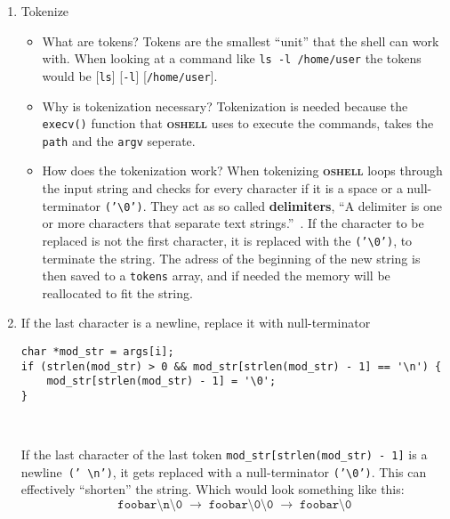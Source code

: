\documentclass[12pt,english]{article}
\newcommand{\funcname}[1]{\texttt{#1()}\xspace} %
\newcommand{\projectname}{\textsc{oshell}}
\begin{document}
\begin{enumerate}
\item Tokenize
  \begin{itemize}
  \item What are tokens?
    Tokens are the smallest ``unit'' that the shell can work with. When
    looking at a command like \texttt{ls -l /home/user} the tokens
    would be [\texttt{ls}] [\texttt{-l}] [\texttt{/home/user}].

  \item Why is tokenization necessary? Tokenization is needed because
    the \funcname{execv} function that \textbf{\projectname} uses to
    execute the
    commands, takes the \texttt{path} and the \texttt{argv} seperate.

  \item How does the tokenization work? When tokenizing
    \textbf{\projectname} loops through the input string and
    checks for every character if it is a space or a null-terminator \texttt{('\textbackslash0')}.
    They act as so called \textbf{delimiters},
    ``A delimiter is one or more characters that separate text strings.''~\cite{WhatDelimiter}.
    If the character 
    to be replaced is not the first character, it is replaced with the \texttt{('\textbackslash0')},  to terminate the string. The adress of the beginning of the new string is then saved to a \texttt{tokens} array, and if needed 
   the memory will be reallocated to fit the string.
    \end{itemize}
    
  \item If the last character is a newline, replace it with null-terminator
\begin{verbatim}
char *mod_str = args[i];
if (strlen(mod_str) > 0 && mod_str[strlen(mod_str) - 1] == '\n') {
    mod_str[strlen(mod_str) - 1] = '\0';
}
\end{verbatim}
    ~\label{mnt:WhatShows}

    If the last character of the last token
\texttt{mod\_str[strlen(mod\_str) - 1]} is a newline~\texttt{(' \textbackslash n')},
it gets replaced with a null-terminator \texttt{('\textbackslash 0')}. 
This can effectively ``shorten'' the string. 
Which would look something like this: 
\[
\texttt{foobar\textbackslash n\textbackslash 0} 
\;\rightarrow\; 
\texttt{foobar\textbackslash 0\textbackslash 0} 
\;\rightarrow\; 
\texttt{foobar\textbackslash 0}
\]


\end{enumerate}
\end{document}
